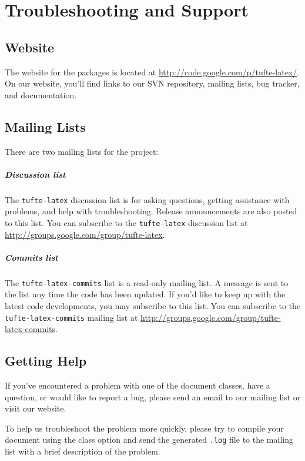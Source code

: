 


\chapter{Troubleshooting and Support}
\label{ch:troubleshooting}

\section{\TL Website}\label{sec:website}
The website for the \TL packages is located at
\url{http://code.google.com/p/tufte-latex/}.  On our website, you'll find
links to our SVN repository, mailing lists, bug tracker, and documentation.

\section{\TL Mailing Lists}\label{sec:mailing-lists}
There are two mailing lists for the \TL project:

\paragraph{Discussion list}
The \texttt{tufte-latex} discussion list is for asking questions, getting
assistance with problems, and help with troubleshooting.  Release announcements
are also posted to this list.  You can subscribe to the \texttt{tufte-latex}
discussion list at \url{http://groups.google.com/group/tufte-latex}.

\paragraph{Commits list}
The \texttt{tufte-latex-commits} list is a read-only mailing list.  A message
is sent to the list any time the \TL code has been updated.  If you'd like to
keep up with the latest code developments, you may subscribe to this list.  You
can subscribe to the \texttt{tufte-latex-commits} mailing list at
\url{http://groups.google.com/group/tufte-latex-commits}.

\section{Getting Help}\label{sec:getting-help}
If you've encountered a problem with one of the \TL document classes, have a
question, or would like to report a bug, please send an email to our
mailing list or visit our website.

To help us troubleshoot the problem more quickly, please try to compile your
document using the  class option and send the generated
\texttt{.log} file to the mailing list with a brief description of the problem.



